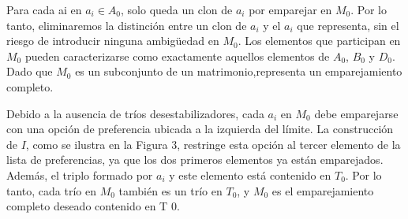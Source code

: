 \documentclass{article}
\begin{document}
Para cada ai en $a_i \in A_0$, solo queda un clon de $a_i$ por emparejar en $M_0$.
Por lo tanto, eliminaremos la distinción entre un clon de $a_i$ y el $a_i$ que representa,
sin el riesgo de introducir ninguna ambigüedad en $M_0$.
Los elementos que participan en $M_0$ pueden caracterizarse como
exactamente aquellos elementos de $A_0$, $B_0$ y $D_0$.
Dado que $M_0$ es un subconjunto de un matrimonio,representa un emparejamiento completo.


Debido a la ausencia de tríos desestabilizadores,
cada $a_i$ en $M_0$ debe emparejarse con una opción 
de preferencia ubicada a la izquierda del límite. 
La construcción de $I$, como se ilustra en la Figura 3, 
restringe esta opción al tercer elemento de la lista de preferencias, 
ya que los dos primeros elementos ya están emparejados. 
Además, el triplo formado por $a_i$ y este elemento está contenido en
$T_0$. 
Por lo tanto, cada trío en $M_0$ también es un trío en $T_0$, y $M_0$ es el emparejamiento completo deseado contenido en T 0.
\end{document}
